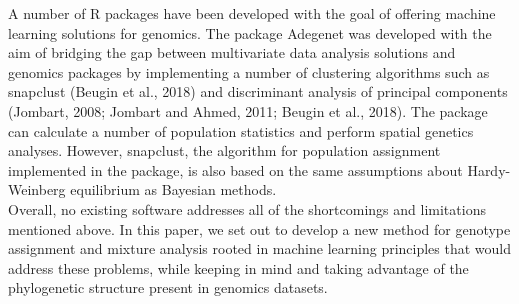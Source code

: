 \documentclass[final]{bioinfo}
\begin{document}
A number of R packages have been developed with the goal of offering machine learning solutions for genomics. The package Adegenet was developed with the aim of bridging the gap between multivariate data analysis solutions and genomics packages by implementing a number of clustering algorithms such as snapclust (Beugin et al., 2018) and discriminant analysis of principal components (Jombart, 2008; Jombart and Ahmed, 2011; Beugin et al., 2018). The package can calculate a number of population statistics and perform spatial genetics analyses. However, snapclust, the algorithm for population assignment implemented in the package, is also based on the same assumptions about Hardy-Weinberg equilibrium as Bayesian methods.\\
Overall, no existing software addresses all of the shortcomings and limitations mentioned above. In this paper, we set out to develop a new method for genotype assignment and mixture analysis rooted in machine learning principles that would address these problems, while keeping in mind and taking advantage of the phylogenetic structure present in genomics datasets.
\end{document}
